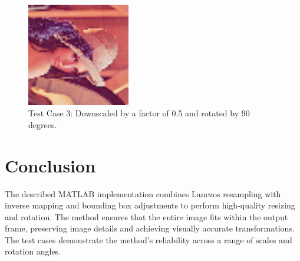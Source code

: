 \documentclass{article}
\begin{document}
\begin{figure}[h!]
    \centering
    \includegraphics[width=0.4\textwidth]{lena_0.50@90.00.png}
    \caption{Test Case 3: Downscaled by a factor of 0.5 and rotated by 90 degrees.}
\end{figure}

\section{Conclusion}

The described MATLAB implementation combines Lanczos resampling with inverse mapping and bounding box adjustments to perform high-quality resizing and rotation. The method ensures that the entire image fits within the output frame, preserving image details and achieving visually accurate transformations. The test cases demonstrate the method's reliability across a range of scales and rotation angles.
\end{document}
